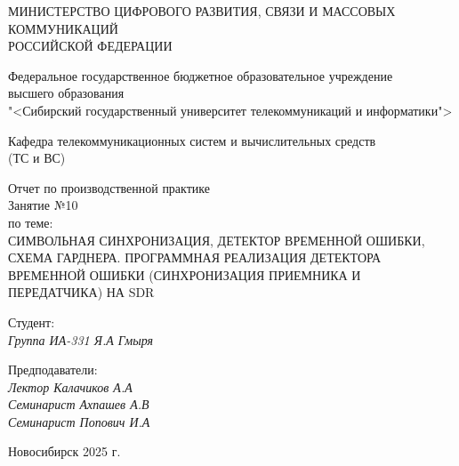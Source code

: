 \thispagestyle{empty}

\begin{center}
    МИНИСТЕРСТВО ЦИФРОВОГО РАЗВИТИЯ, СВЯЗИ И МАССОВЫХ КОММУНИКАЦИЙ \\ РОССИЙСКОЙ ФЕДЕРАЦИИ

    \vspace{20pt}

    Федеральное государственное бюджетное образовательное учреждение  \\  высшего образования \\
    "<Сибирский государственный университет телекоммуникаций и информатики"> \\

    \vspace{20pt}

    Кафедра телекоммуникационных систем и вычислительных средств \\  (ТС и ВС)
\end{center}

\vfill

\begin{center}
    Отчет по производственной практике \\  
    Занятие №10 \\

    \vspace{20pt}
    по теме: \\
    \uppercase{Символьная синхронизация, детектор временной ошибки, схема Гарднера.
    Программная реализация детектора временной ошибки (синхронизация приемника и передатчика) на SDR}
\end{center}

\vfill

    \noindent Студент: \\
    \textit{Группа ИА-331 \hfill Я.А Гмыря}

    \vspace{20pt}

    \noindent Предподаватели: \\
    \textit{Лектор \hfill Калачиков А.А} \\
    \textit{Семинарист \hfill Ахпашев А.В} \\
    \textit{Семинарист \hfill Попович И.А}

\vfill

\begin{center}
    Новосибирск 2025 г.
\end{center}